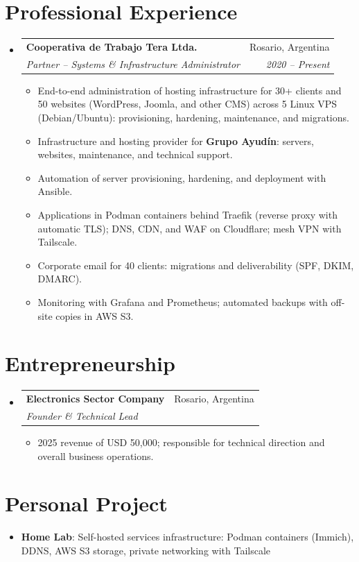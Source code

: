 \documentclass[letterpaper,10pt]{article}
\makeatletter
\newcommand{\resumeItem}[2]{
    \item\small{
        \textbf{#1}: #2
    }
}
\newcommand{\resumeSubheading}[4]{
    \vspace{0.5mm}\item
    \begin{tabular*}{0.97\textwidth}[t]{l@{\extracolsep{\fill}}r}
        \textbf{#1} & #2 \\
        \textit{#3} & \textit{#4} \\
    \end{tabular*}\vspace{0.5mm}
}
\newcommand{\achievementItem}[1]{
    \item\small{#1}
}
\makeatother
\begin{document}
\section{Professional Experience}
\begin{itemize}[leftmargin=*]
    \resumeSubheading
    {Cooperativa de Trabajo Tera Ltda.}{Rosario, Argentina}
    {Partner -- Systems \& Infrastructure Administrator}{2020 -- Present}
    \begin{itemize}
        \achievementItem{End-to-end administration of hosting infrastructure for 30+ clients and 50 websites (WordPress, Joomla, and other CMS) across 5 Linux VPS (Debian/Ubuntu): provisioning, hardening, maintenance, and migrations.}
        \achievementItem{Infrastructure and hosting provider for \textbf{Grupo Ayudín}: servers, websites, maintenance, and technical support.}
        \achievementItem{Automation of server provisioning, hardening, and deployment with Ansible.}
        \achievementItem{Applications in Podman containers behind Traefik (reverse proxy with automatic TLS); DNS, CDN, and WAF on Cloudflare; mesh VPN with Tailscale.}
        \achievementItem{Corporate email for 40 clients: migrations and deliverability (SPF, DKIM, DMARC).}
        \achievementItem{Monitoring with Grafana and Prometheus; automated backups with off-site copies in AWS S3.}
    \end{itemize}
\end{itemize}

\section{Entrepreneurship}
\begin{itemize}[leftmargin=*]
    \resumeSubheading
    {Electronics Sector Company}{Rosario, Argentina}
    {Founder \& Technical Lead}{}
    \begin{itemize}
        \achievementItem{2025 revenue of USD 50,000; responsible for technical direction and overall business operations.}
    \end{itemize}
\end{itemize}

\section{Personal Project}
\begin{itemize}[leftmargin=*]
    \resumeItem{Home Lab}{Self-hosted services infrastructure: Podman containers (Immich), DDNS, AWS S3 storage, private networking with Tailscale}
\end{itemize}
\end{document}
